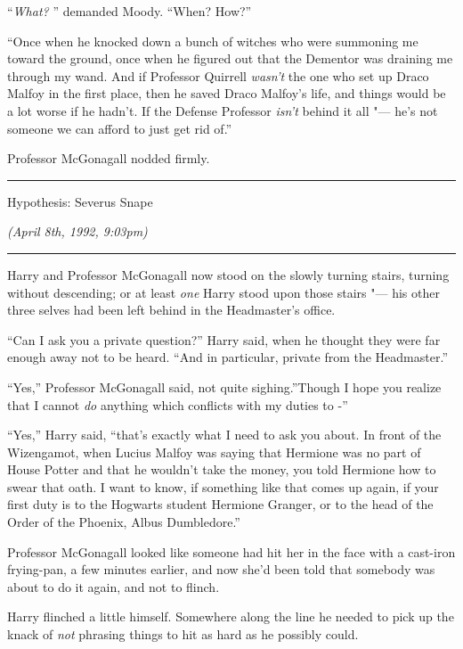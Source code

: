 ``\emph{What?} '' demanded Moody. ``When? How?''

``Once when he knocked down a bunch of witches who were summoning me
toward the ground, once when he figured out that the Dementor was
draining me through my wand. And if Professor Quirrell \emph{wasn't} the
one who set up Draco Malfoy in the first place, then he saved Draco
Malfoy's life, and things would be a lot worse if he hadn't. If the
Defense Professor \emph{isn't} behind it all "--- he's not someone we can
afford to just get rid of.''

Professor McGonagall nodded firmly.

\begin{center}\rule{3in}{0.4pt}\end{center}

Hypothesis: Severus Snape

\emph{(April 8th, 1992, 9:03pm)}

\begin{center}\rule{3in}{0.4pt}\end{center}

Harry and Professor McGonagall now stood on the slowly turning stairs,
turning without descending; or at least \emph{one} Harry stood upon
those stairs "--- his other three selves had been left behind in the
Headmaster's office.

``Can I ask you a private question?'' Harry said, when he thought they
were far enough away not to be heard. ``And in particular, private from
the Headmaster.''

``Yes,'' Professor McGonagall said, not quite sighing.''Though I hope
you realize that I cannot \emph{do} anything which conflicts with my
duties to -''

``Yes,'' Harry said, ``that's exactly what I need to ask you about. In
front of the Wizengamot, when Lucius Malfoy was saying that Hermione was
no part of House Potter and that he wouldn't take the money, you told
Hermione how to swear that oath. I want to know, if something like that
comes up again, if your first duty is to the Hogwarts student Hermione
Granger, or to the head of the Order of the Phoenix, Albus Dumbledore.''

Professor McGonagall looked like someone had hit her in the face with a
cast-iron frying-pan, a few minutes earlier, and now she'd been told
that somebody was about to do it again, and not to flinch.

Harry flinched a little himself. Somewhere along the line he needed to
pick up the knack of \emph{not} phrasing things to hit as hard as he
possibly could.


